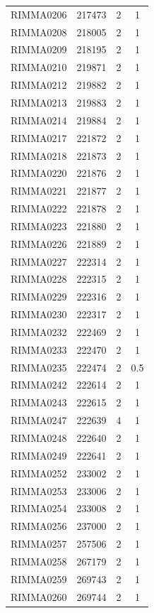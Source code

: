 \documentclass[11pt]{article}
\newcounter{rowno}
\begin{document}
\begin{scriptsize}
\begin{longtable}{>{\stepcounter{rowno}}cccc}
    RIMMA0206 & 217473 & 2     & 1 \\
    RIMMA0208 & 218005 & 2     & 1 \\
    RIMMA0209 & 218195 & 2     & 1 \\
    RIMMA0210 & 219871 & 2     & 1 \\
    RIMMA0212 & 219882 & 2     & 1 \\
    RIMMA0213 & 219883 & 2     & 1 \\
    RIMMA0214 & 219884 & 2     & 1 \\
    RIMMA0217 & 221872 & 2     & 1 \\
    RIMMA0218 & 221873 & 2     & 1 \\
    RIMMA0220 & 221876 & 2     & 1 \\
    RIMMA0221 & 221877 & 2     & 1 \\
    RIMMA0222 & 221878 & 2     & 1 \\
    RIMMA0223 & 221880 & 2     & 1 \\
    RIMMA0226 & 221889 & 2     & 1 \\
    RIMMA0227 & 222314 & 2     & 1 \\
    RIMMA0228 & 222315 & 2     & 1 \\
    RIMMA0229 & 222316 & 2     & 1 \\
    RIMMA0230 & 222317 & 2     & 1 \\
    RIMMA0232 & 222469 &  2     & 1 \\
    RIMMA0233 & 222470 & 2     & 1 \\
    RIMMA0235 & 222474 & 2     & 0.5 \\
    RIMMA0242 & 222614 & 2     & 1 \\
    RIMMA0243 & 222615 & 2     & 1 \\
    RIMMA0247 & 222639 & 4     & 1 \\
    RIMMA0248 & 222640 & 2     & 1 \\
    RIMMA0249 & 222641 & 2     & 1 \\
    RIMMA0252 & 233002 & 2     & 1 \\
    RIMMA0253 & 233006 & 2     & 1 \\
    RIMMA0254 & 233008 & 2     & 1 \\
    RIMMA0256 & 237000 & 2     & 1 \\
    RIMMA0257 & 257506 & 2     & 1 \\
    RIMMA0258 & 267179 & 2     & 1 \\
    RIMMA0259 & 269743 & 2     & 1 \\
    RIMMA0260 & 269744 & 2     & 1 \\

\end{longtable}
\end{scriptsize}
\end{document}
